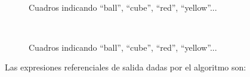 



\begin{figure}[ht]
\begin{center}
\\[0pt]
\caption{Cuadros indicando ``ball'', ``cube'', ``red'', ``yellow''...}
\label{fig-modelo16}
\end{center}
\end{figure}

\begin{figure}[ht]
\begin{center}
\\[0pt]
\caption{Cuadros indicando ``ball'', ``cube'', ``red'', ``yellow''...}
\label{fig-modelo17}
\end{center}
\end{figure}

Las expresiones referenciales de salida dadas por el algoritmo son:\\

